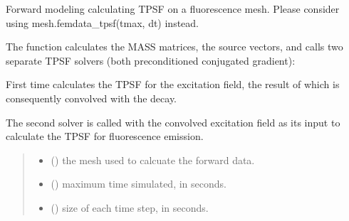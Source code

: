 \documentclass[letterpaper,10pt,english]{sphinxmanual}
\begin{document}
\begin{fulllineitems}
\label{\detokenize{_autosummary/nirfasterff.forward.femdata.femdata_fl_TR:nirfasterff.forward.femdata.femdata_fl_TR}}
\pysigstartsignatures
{}
\pysigstopsignatures
\sphinxAtStartPar
Forward modeling calculating TPSF on a fluorescence mesh. Please consider using mesh.femdata\_tpsf(tmax, dt) instead.

\sphinxAtStartPar
The function calculates the MASS matrices, the source vectors, and calls two separate TPSF solvers (both preconditioned conjugated gradient):

\sphinxAtStartPar
First time calculates the TPSF for the excitation field, the result of which is consequently convolved with the decay.

\sphinxAtStartPar
The second solver is called with the convolved excitation field as its input to calculate the TPSF for fluorescence emission.
\begin{quote}\begin{description}
\begin{itemize}
\item {} 
\sphinxAtStartPar
{} () \textendash{} the mesh used to calcuate the forward data.

\item {} 
\sphinxAtStartPar
{} () \textendash{} maximum time simulated, in seconds.

\item {} 
\sphinxAtStartPar
{} () \textendash{} size of each time step, in seconds.


\end{itemize}
\end{description}
\end{quote}
\end{fulllineitems}
\end{document}
